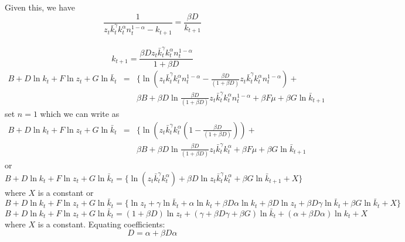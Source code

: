 \documentclass[11pt]{article}
\begin{document}
\begin{enumerate}
\begin{enumerate}
Given this, we have 
\begin{equation*}
\frac{1}{z_{t}\bar{k}_{t}^{\gamma }k_{t}^{\alpha }n_{t}^{1-\alpha }-k_{t+1}}=%
\frac{\beta D}{k_{t+1}}
\end{equation*}%
$\allowbreak \allowbreak $%
\begin{equation*}
k_{t+1}=\frac{\beta Dz_{t}\bar{k}_{t}^{\gamma }k_{t}^{\alpha
}n_{t}^{1-\alpha }}{1+\beta D}
\end{equation*}%
\begin{eqnarray*}
B+D\ln k_{t}+F\ln z_{t}+G\ln \bar{k}_{t} &=&\{\ln \left( z_{t}\bar{k}%
_{t}^{\gamma }k_{t}^{\alpha }n_{t}^{1-\alpha }-\frac{\beta D}{\left( 1+\beta
D\right) }z_{t}\bar{k}_{t}^{\gamma }k_{t}^{\alpha }n_{t}^{1-\alpha }\right) +
\\
&&\beta B+\beta D\ln \frac{\beta D}{\left( 1+\beta D\right) }z_{t}\bar{k}%
_{t}^{\gamma }k_{t}^{\alpha }n_{t}^{1-\alpha }+\beta F\mu +\beta G\ln \bar{k}%
_{t+1}
\end{eqnarray*}%
set $n=1$ which we can write as%
\begin{eqnarray*}
B+D\ln k_{t}+F\ln z_{t}+G\ln \bar{k}_{t} &=&\{\ln \left( z_{t}\bar{k}%
_{t}^{\gamma }k_{t}^{\alpha }\left( 1-\frac{\beta D}{\left( 1+\beta D\right) 
}\right) \right) + \\
&&\beta B+\beta D\ln \frac{\beta D}{\left( 1+\beta D\right) }z_{t}\bar{k}%
_{t}^{\gamma }k_{t}^{\alpha }+\beta F\mu +\beta G\ln \bar{k}_{t+1}
\end{eqnarray*}%
or%
\begin{equation*}
B+D\ln k_{t}+F\ln z_{t}+G\ln \bar{k}_{t}=\{\ln \left( z_{t}\bar{k}%
_{t}^{\gamma }k_{t}^{\alpha }\right) +\beta D\ln z_{t}\bar{k}_{t}^{\gamma
}k_{t}^{\alpha }+\beta G\ln \bar{k}_{t+1}+X\}
\end{equation*}%
where $X$ is a constant or 
\begin{equation*}
B+D\ln k_{t}+F\ln z_{t}+G\ln \bar{k}_{t}=\{\ln z_{t}+\gamma \ln \bar{k}%
_{t}+\alpha \ln k_{t}+\beta D\alpha \ln k_{t}+\beta D\ln z_{t}+\beta D\gamma
\ln \bar{k}_{t}+\beta G\ln \bar{k}_{t}+X\}
\end{equation*}%
\begin{equation*}
B+D\ln k_{t}+F\ln z_{t}+G\ln \bar{k}_{t}=\left( 1+\beta D\right) \ln
z_{t}+\left( \gamma +\beta D\gamma +\beta G\right) \ln \bar{k}_{t}+\left(
\alpha +\beta D\alpha \right) \ln k_{t}+X
\end{equation*}%
where $X$ is a constant. Equating coefficients:%
\begin{equation*}
D=\alpha +\beta D\alpha 
\end{equation*}%

\end{enumerate}
\end{enumerate}
\end{document}

